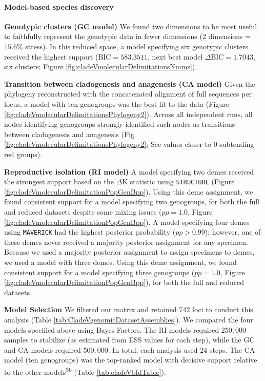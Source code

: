 \documentclass[
  11pt,
]{article}
\begin{document}
\hypertarget{model-based-species-discovery-9}{%
\paragraph{Model-based species discovery}\label{model-based-species-discovery-9}}

\textbf{Genotypic clusters (GC model)} We found two dimensions to be most useful to faithfully represent the genotypic data in fewer dimensions (2 dimensions = \(15.6\%\) stress). In this reduced space, a model specifying six genotypic clusters received the highest support (BIC\(=583.3511\), next best model \(\Delta\)BIC\(=1.7043\), six clusters; Figure \ref{fig:cladeVmolecularDelimitationsNmms}).

\textbf{Transition between cladogenesis and anagenesis (CA model)} Given the phylogeny reconstructed with the concatenated alignment of full sequences per locus, a model with ten genogroups was the best fit to the data (Figure \ref{fig:cladeVmolecularDelimitationsPhylogeny2}). Across all independent runs, all nodes identifying genogroups strongly identified such nodes as transitions between cladogenesis and anagenesis (Fig \ref{fig:cladeVmolecularDelimitationsPhylogeny2}; See values closer to \(0\) subtending red groups).

\textbf{Reproductive isolation (RI model)} A model specifying two demes received the strongest support based on the \(\Delta\)K statistic using \texttt{STRUCTURE} (Figure \ref{fig:cladeVmolecularDelimitationPopGenBpp}). Using this deme assignment, we found consistent support for a model specifying two genogroups, for both the full and reduced datasets despite some mixing issues (\(pp=1.0\), Figure \ref{fig:cladeVmolecularDelimitationPopGenBpp}). A model specifying four demes using \texttt{MAVERICK} had the highest posterior probability (\(pp>0.99\)); however, one of these demes never received a majority posterior assignment for any specimen. Because we used a majority posterior assignment to assign specimens to demes, we used a model with three demes. Using this deme assignment, we found consistent support for a model specifying three genogroups (\(pp=1.0\), Figure \ref{fig:cladeVmolecularDelimitationPopGenBpp}), for both the full and reduced datasets.

\textbf{Model Selection} We filtered our matrix and retained \(742\) loci to conduct this analysis (Table \ref{tab:CladeVgenomicDatasetAssemblies}). We compared the four models specified above using Bayes Factors. The RI models required \(250,000\) samples to stabilize (as estimated from ESS values for each step), while the GC and CA models required \(500,000\). In total, each analysis used \(24\) steps. The CA model (ten genogroups) was the top-ranked model with decisive support relative to the other models\textsuperscript{36} (Table \ref{tab:cladeVbfdTable}).
\end{document}
